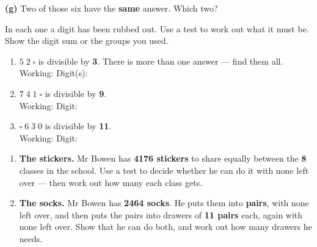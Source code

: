 \documentclass[12pt,a4paper]{article}
\begin{document}
\vspace{6pt}
\noindent\textbf{(g)} Two of those six have the \textbf{same} answer. Which two?
\blank[6.4cm]


\noindent In each one a digit has been rubbed out. Use a test to work out what it must
be. Show the digit sum or the groups you used.

\vspace{8pt}
\begin{enumerate}[label=\textbf{\arabic*.}, itemsep=11pt]
  \item $5\;2\;\square$ is divisible by \textbf{3}. There is more than one answer ---
        find them all.\\[4pt]
        Working: \blank[7.2cm] \quad Digit(s): \blank[3.2cm]
  \item $7\;4\;1\;\square$ is divisible by \textbf{9}.\\[4pt]
        Working: \blank[7.2cm] \quad Digit: \blank[3.2cm]
  \item $\square\;6\;3\;0$ is divisible by \textbf{11}.\\[4pt]
        Working: \blank[7.2cm] \quad Digit: \blank[3.2cm]
\end{enumerate}


\begin{enumerate}[label=\textbf{\arabic*.}, itemsep=14pt]

  \item \textbf{The stickers.} Mr Bowen has \textbf{4176 stickers} to share equally
        between the \textbf{8} classes in the school. Use a test to decide whether he
        can do it with none left over --- then work out how many each class gets.
        \begin{workspace}[2.7cm]\end{workspace}

  \item \textbf{The socks.} Mr Bowen has \textbf{2464 socks}. He puts them into
        \textbf{pairs}, with none left over, and then puts the pairs into drawers of
        \textbf{11 pairs} each, again with none left over. Show that he can do both,
        and work out how many drawers he needs.
        \begin{workspace}[2.9cm]\end{workspace}

\end{enumerate}
\end{document}
